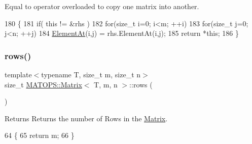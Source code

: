 Equal to operator overloaded to copy one matrix into another. 


\begin{DoxyCode}
180                                                              \{
181                                 \textcolor{keywordflow}{if}( \textcolor{keyword}{this} != &rhs )
182                                         \textcolor{keywordflow}{for}(\textcolor{keywordtype}{size\_t} i=0; i<m; ++i)
183                                         \textcolor{keywordflow}{for}(\textcolor{keywordtype}{size\_t} j=0; j<n; ++j)
184                                                 \hyperlink{classMATOPS_1_1Matrix_a9eabd6b452bd01040c9ecaadc2ad6562}{ElementAt}(i,j) = rhs.ElementAt(i,j);
185                                 \textcolor{keywordflow}{return} *\textcolor{keyword}{this};
186                         \}
\end{DoxyCode}
\mbox{\label{classMATOPS_1_1Matrix_a3eb38202054437704ba4ceba78959d5b}} 
\subsubsection{\texorpdfstring{rows()}{rows()}}
{\footnotesize\ttfamily template$<$typename T, size\+\_\+t m, size\+\_\+t n$>$ \\
size\+\_\+t \hyperlink{classMATOPS_1_1Matrix}{M\+A\+T\+O\+P\+S\+::\+Matrix}$<$ T, m, n $>$\+::rows (\begin{DoxyParamCaption}{ }\end{DoxyParamCaption})\hspace{0.3cm}{\ttfamily [inline]}}

\begin{DoxyReturn}{Returns}
Returns the number of Rows in the \hyperlink{classMATOPS_1_1Matrix}{Matrix}. 
\end{DoxyReturn}

\begin{DoxyCode}
64                         \{
65                                 \textcolor{keywordflow}{return} m;
66                         \}
\end{DoxyCode}
\mbox{\label{classMATOPS_1_1Matrix_aa278f18f2e1324c56d965cd5e033b4eb}} 
